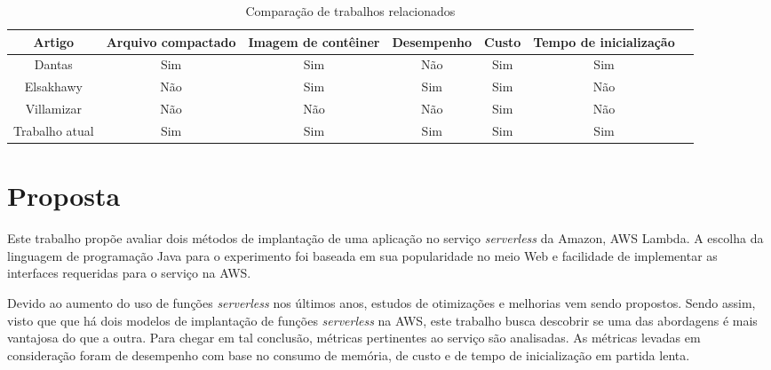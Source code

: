 \documentclass[conference]{IEEEtran}
\begin{document}
\begin{table}[htb]
    \centering
    \caption{Comparação de trabalhos relacionados}
    \label{tab:related_papers}
    \begin{tabular}{ccccccc}
        \hline
         Artigo & Arquivo compactado & Imagem de contêiner & Desempenho & Custo & Tempo de inicialização \\
        \hline
         Dantas\cite{dantas_2022_reducing_cold_start} & Sim & Sim & Não & Sim & Sim \\
        \hline
         Elsakhawy\cite{Elsakhawy_2021_performance_analysis_serverless} & Não  & Sim & Sim & Sim & Não \\
        \hline
         Villamizar\cite{Villamizar_2017_cost_comparison_lambda} & Não & Não & Não & Sim & Não \\
        \hline
         Trabalho atual & Sim & Sim & Sim & Sim & Sim \\
        \hline
    \end{tabular}   
\end{table}

\section{Proposta}
\label{sec:proposal}

Este trabalho propõe avaliar dois métodos de implantação de uma aplicação no serviço \textit{serverless} da Amazon, AWS Lambda.
A escolha da linguagem de programação Java para o experimento foi baseada em sua popularidade no meio Web e facilidade de implementar as interfaces requeridas para o serviço na AWS.

Devido ao aumento do uso de funções \textit{serverless} nos últimos anos, estudos de otimizações e melhorias vem sendo propostos. Sendo assim, visto que que há dois modelos de implantação de funções \textit{serverless} na AWS, este trabalho busca descobrir se uma das abordagens é mais vantajosa do que a outra. Para chegar em tal conclusão, métricas pertinentes ao serviço são analisadas. As métricas levadas em consideração foram de desempenho com base no consumo de memória, de custo e de tempo de inicialização em partida lenta. 

\end{document}
